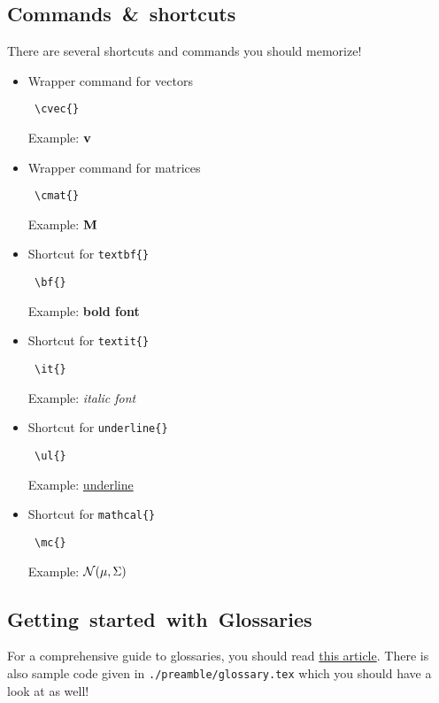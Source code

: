 	\subsection{Commands~\&~shortcuts}
		There are several shortcuts and commands you should memorize! %
		\begin{itemize}
			\item Wrapper command for vectors\begin{verbatim} \cvec{} \end{verbatim} Example: $\boldsymbol{\mathrm{v}}$
			\item Wrapper command for matrices\begin{verbatim} \cmat{} \end{verbatim} Example: $\boldsymbol{\mathrm{M}}$
			\item Shortcut for \texttt{\bs{}textbf\{\}}\begin{verbatim} \bf{} \end{verbatim} Example: \bf{bold font}
			\item Shortcut for \texttt{\bs{}textit\{\}}\begin{verbatim} \it{} \end{verbatim} Example: \it{italic font}
			\item Shortcut for \texttt{\bs{}underline\{\}}\begin{verbatim} \ul{} \end{verbatim} Example: \ul{underline}
			\item Shortcut for \texttt{\bs{}mathcal\{\}}\begin{verbatim} \mc{} \end{verbatim} Example: $\mathcal{N}(\mu,\Sigma)$
		\end{itemize}
	\subsection{Getting~started~with~Glossaries}
		For a comprehensive guide to glossaries, you should read \href{http://en.wikibooks.org/wiki/LaTeX/Glossary}{this article}. %
		There is also sample code given in \texttt{./preamble/glossary.tex} which you should have a look at as well!